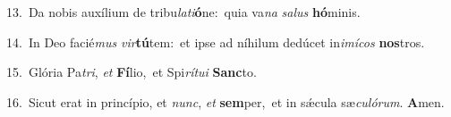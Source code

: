 {\numbfont\textcolor{\numbcolor}{13.}}~Da nobis auxílium de tribu\-\textit{la}\-\textit{ti}\textbf{ó}ne:~\star quia va\textit{na} \textit{sa}\-\textit{lus} \textbf{hó}\-minis.\par
{\numbfont\textcolor{\numbcolor}{14.}}~In Deo facié\textit{mus} \textit{vir}\-\textbf{tú}tem:~\star et ipse ad níhilum dedúcet in\-\textit{i}\-\textit{mí}\textit{cos} \textbf{nos}\-tros.\par
{\numbfont\textcolor{\numbcolor}{15.}}~Glória Pa\-\textit{tri}\-, \textit{et} \textbf{Fí}\-lio,~\star et Spi\-\textit{rí}\-\textit{tu}\textit{i} \textbf{Sanc}\-to.\par
{\numbfont\textcolor{\numbcolor}{16.}}~Sicut erat in princípio, et \textit{nunc}\-, \textit{et} \textbf{sem}\-per,~\star et in sǽcula sæ\-\textit{cu}\-\textit{ló}\textit{rum}. \textbf{A}\-men.\par
